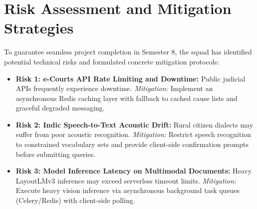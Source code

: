 \section{Risk Assessment and Mitigation Strategies}
\label{sec:risk_mitigation}
To guarantee seamless project completion in Semester 8, the squad has identified potential technical risks and formulated concrete mitigation protocols:
\begin{itemize}
    \item \textbf{Risk 1: e-Courts API Rate Limiting and Downtime:} Public judicial APIs frequently experience downtime. \textit{Mitigation:} Implement an asynchronous Redis caching layer with fallback to cached cause lists and graceful degraded messaging.
    \item \textbf{Risk 2: Indic Speech-to-Text Acoustic Drift:} Rural citizen dialects may suffer from poor acoustic recognition. \textit{Mitigation:} Restrict speech recognition to constrained vocabulary sets and provide client-side confirmation prompts before submitting queries.
    \item \textbf{Risk 3: Model Inference Latency on Multimodal Documents:} Heavy LayoutLMv3 inference may exceed serverless timeout limits. \textit{Mitigation:} Execute heavy vision inference via asynchronous background task queues (Celery/Redis) with client-side polling.
\end{itemize}
